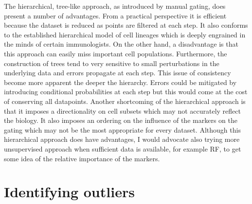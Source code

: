 The hierarchical, tree-like approach, as introduced by manual gating, does present a number of advantages.
From a practical perspective it is efficient because the dataset is reduced as points are filtered at each step.
It also conforms to the established hierarchical model of cell lineages which is deeply engrained in the minds of certain immunologists.
On the other hand, a disadvantage is that this approach can easily miss important cell populations.
Furthermore, the construction of trees tend to very sensitive to small perturbations in the underlying data and errors propagate at each step.
This issue of consistency become more apparent the deeper the hierarchy.
Errors could be mitigated by introducing conditional probabilities at each step but this would come at the cost of conserving all datapoints.
Another shortcoming of the hierarchical approach is that it imposes a directionality on cell subsets which may not accurately reflect the biology.
It also imposes an ordering on the influence of the markers on the gating which may not be the most appropriate for every dataset.
Although this hierarchical approach does have advantages, I would advocate also trying more unsupervised approach when sufficient data is available, for example \gls{RF}, to get some idea of the relative importance of the markers.


\section{ Identifying outliers }

